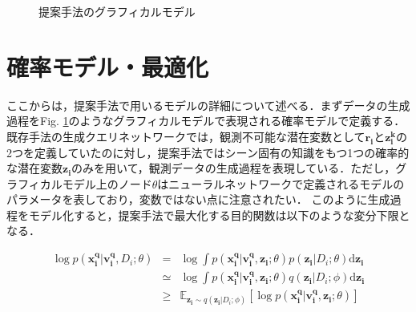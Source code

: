 \begin{figure}[tbp]
\begin{center}
\caption{提案手法のグラフィカルモデル}
\label{fig:gm_proposal}
\end{center}
\end{figure}

\section{確率モデル・最適化}
ここからは，提案手法で用いるモデルの詳細について述べる．まずデータの生成過程をFig. \ref{fig:gm_proposal}のようなグラフィカルモデルで表現される確率モデルで定義する．既存手法の生成クエリネットワークでは，観測不可能な潜在変数として$\bm{r_i}$と$\bm{z_i^k}$の2つを定義していたのに対し，提案手法ではシーン固有の知識をもつ1つの確率的な潜在変数$\bm{z_i}$のみを用いて，観測データの生成過程を表現している．ただし，グラフィカルモデル上のノード$\theta$はニューラルネットワークで定義されるモデルのパラメータを表しており，変数ではない点に注意されたい．
このように生成過程をモデル化すると，提案手法で最大化する目的関数は以下のような変分下限となる．

\begin{eqnarray}
\log p ( \bm{x _ i  ^ q} | \bm{v _i ^ q}, D_i ; \theta ) 
&=& \log \int p ( \bm{x _i ^ q} | \bm{v _i ^ q} , \bm{z _ i} ; \theta ) p ( \bm{z_i} | D_i ; \theta ) \mathrm { d } \bm{z_i} \\
&\simeq& \log \int p ( \bm{x _i ^ q} | \bm{v _i ^ q} , \bm{z _ i} ; \theta ) q ( \bm{z_i} | D_i ; \phi ) \mathrm { d } \bm{z_i} \\
&\geq& \mathbb{E}_{\bm{z_i} \sim q ( \bm{z_i} | D_i ; \phi )} [\log p ( \bm{x _i ^ q} | \bm{v _i ^ q} , \bm{z _ i} ; \theta )] \label{eq:proposal_loss}
\end{eqnarray}


